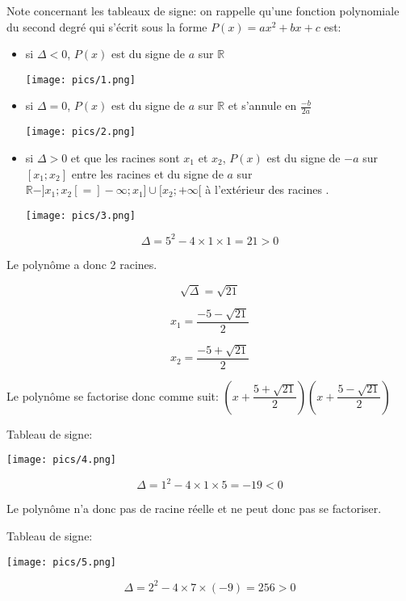 \documentclass[a4paper,12pt]{scrartcl}
\begin{document}
Note concernant les tableaux de signe: on rappelle qu'une fonction polynomiale du second degré qui s'écrit sous la forme $P(x) = ax^2 + bx + c$ est:

\begin{itemize}
\item si $\Delta < 0$, $P(x)$ est du signe de $a$ sur $\mathbb{R}$

\texttt{[image: pics/1.png]}

\item si $\Delta = 0$, $P(x)$ est du signe de $a$ sur $\mathbb{R}$ et s'annule en $\frac{-b}{2a}$

\texttt{[image: pics/2.png]}


\item si $\Delta > 0$ et que les racines sont $x_1$ et $x_2$, $P(x)$ est du signe de $-a$ sur $[x_1;x_2]$ \og entre les racines \fg{}  et du signe de $a$ sur $\mathbb{R} - ]x_1;x_2[ = ]-\infty ; x_1] \cup [x_2 ; +\infty[$ \og à l'extérieur des racines \fg{}.

\texttt{[image: pics/3.png]}


\end{itemize}


$$\Delta = 5^2 - 4 \times 1 \times 1 = 21 > 0$$

Le polynôme a donc 2 racines.

$$\sqrt{\Delta} = \sqrt{21}$$

$$x_1 = \dfrac{-5 - \sqrt{21}}{2}$$

$$x_2 = \dfrac{-5 + \sqrt{21}}{2}$$

Le polynôme se factorise donc comme suit: $\left(x + \dfrac{5 + \sqrt{21}}{2}\right)\left(x + \dfrac{5 - \sqrt{21}}{2}\right)$

Tableau de signe:

\texttt{[image: pics/4.png]}



$$\Delta = 1^2 - 4 \times 1 \times 5 = -19 < 0$$

Le polynôme n'a donc pas de racine réelle et ne peut donc pas se factoriser.

Tableau de signe:

\texttt{[image: pics/5.png]}



$$\Delta = 2^2 - 4 \times 7 \times (-9) = 256 > 0$$
\end{document}

